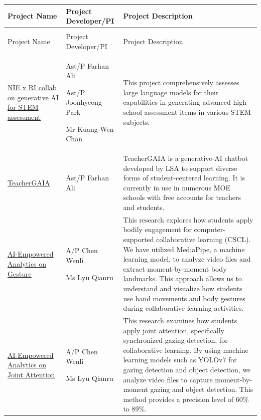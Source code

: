 \documentclass[english]{textolivre}
\begin{document}
\begin{small}
\begin{longtable}{>{\raggedright\arraybackslash}p{3.2cm}
                  >{\raggedright\arraybackslash}p{2.8cm}
                  >{\raggedright\arraybackslash}p{7.5cm}}
\label{tab:appendix_projects_aied}\\
\toprule
Project Name &
Project Developer/PI &
Project Description \\
\midrule
\endfirsthead

\multicolumn{3}{l}{\textit{Table \thetable\ (continued)}}\\
\toprule
Project Name &
Project Developer/PI &
Project Description \\
\midrule
\endhead

\href{https://www.ntu.edu.sg/nie/aied/nie-x-ri-collab-on-generative-ai-for-stem-assessment}{NIE x RI collab on generative AI for STEM assessment}
&
Ast/P Farhan Ali

Ast/P Joonhyeong Park

Mr Kuang-Wen Chan
&
This project comprehensively assesses large language models for their capabilities in generating advanced high school assessment items in various STEM subjects.
\\

\href{https://teachergaia.rdc.nie.edu.sg/v2}{TeacherGAIA}
&
Ast/P Farhan Ali
&
TeacherGAIA is a generative-AI chatbot developed by LSA to support diverse forms of student-centered learning. It is currently in use in numerous MOE schools with free accounts for teachers and students.
\\

\href{https://www.ntu.edu.sg/nie/aied/ai-empowered-analytics-on-gesture}{AI-Empowered Analytics on Gesture}
&
A/P Chen Wenli

Ms Lyu Qianru
&
This research explores how students apply bodily engagement for computer-supported collaborative learning (CSCL). We have utilized MediaPipe, a machine learning model, to analyze video files and extract moment-by-moment body landmarks. This approach allows us to understand and visualize how students use hand movements and body gestures during collaborative learning activities.
\\

\href{https://www.ntu.edu.sg/nie/aied/ai-empowered-analytics-on-gesture}{AI-Empowered Analytics on Joint Attention}
&
A/P Chen Wenli

Ms Lyu Qianru
&
This research examines how students apply joint attention, specifically synchronized gazing detection, for collaborative learning. By using machine learning models such as YOLOv7 for gazing detection and object detection, we analyze video files to capture moment-by-moment gazing and object detection. This method provides a precision level of 60\% to 89\%.
\\


\end{longtable}
\end{small}
\end{document}
